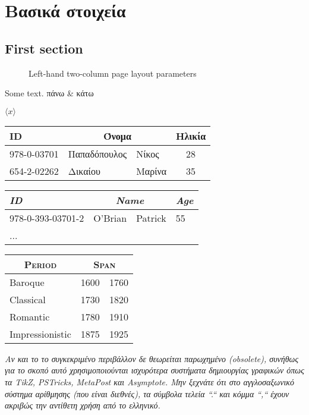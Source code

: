 \documentclass[11pt]{report}
\begin{document}
\chapter{Βασικά στοιχεία}
	
\section{First section}

\begin{figure}
	\oddpagelayoutfalse
	\twocolumnlayouttrue
	\pagediagram
	\caption{Left-hand two-column page layout parameters} \label{fig:pplt}
\end{figure}

Some text. πάνω \& κάτω
	
$\langle x \rangle$

\begin{tabular}{lllc}
	ID          & \multicolumn{2}{c}{Όνομα} & Ηλικία \\
	\hline
	978-0-03701 & Παπαδόπουλος & Νίκος      & 28  \\
	654-2-02262 & Δικαίου      & Μαρίνα     & 35  
\end{tabular}

\begin{tabular}{lccl} 
	\textit{ID}       &\multicolumn{2}{c}{\textit{Name}} &\textit{Age} \\
	\hline  
	978-0-393-03701-2 &O'Brian &Patrick                  &55           \\
	...
\end{tabular}

\begin{tabular}{l|r@{--}l} 
	\multicolumn{1}{c}{\textsc{Period}} & \multicolumn{2}{c}{\textsc{Span}} \\ \hline
	Baroque          &1600              &1760         \\
	Classical        &1730              &1820         \\
	Romantic         &1780              &1910         \\
	Impressionistic  &1875              &1925
\end{tabular}

{\slshape Αν και το το συγκεκριμένο περιβάλλον δε θεωρείται παρωχημένο (obsolete), συνήθως για το σκοπό αυτό χρησιμοποιούνται ισχυρότερα συστήματα δημιουργίας γραφικών όπως τα TikZ, PSTricks, MetaPost και Asymptote. Μην ξεχνάτε ότι στο αγγλοσαξωνικό σύστημα αρίθμησης (που είναι διεθνές), τα σύμβολα τελεία ``.`` και κόμμα ``,`` έχουν ακριβώς την αντίθετη χρήση από το ελληνικό.}
\end{document}
